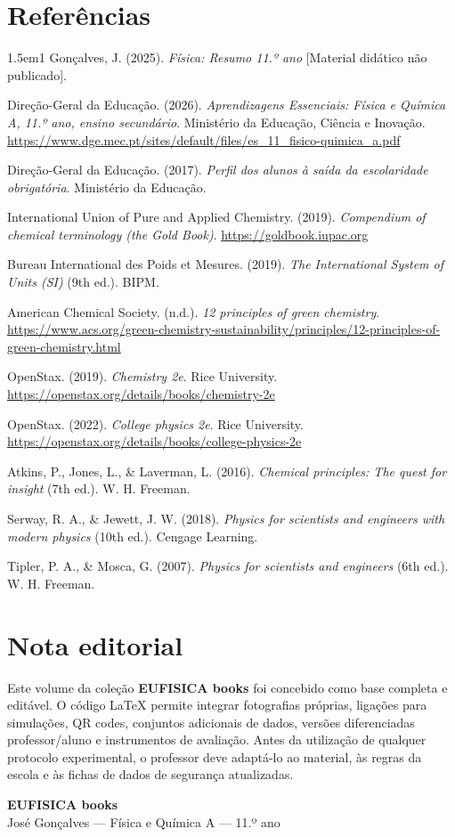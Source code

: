 \documentclass[11pt,a4paper,oneside]{book}
\begin{document}
\chapter{Referências}
\begin{hangparas}{1.5em}{1}
Gonçalves, J. (2025). \textit{Física: Resumo 11.º ano} [Material didático não publicado].

Direção-Geral da Educação. (2026). \textit{Aprendizagens Essenciais: Física e Química A, 11.º ano, ensino secundário}. Ministério da Educação, Ciência e Inovação. \url{https://www.dge.mec.pt/sites/default/files/es_11_fisico-quimica_a.pdf}

Direção-Geral da Educação. (2017). \textit{Perfil dos alunos à saída da escolaridade obrigatória}. Ministério da Educação.

International Union of Pure and Applied Chemistry. (2019). \textit{Compendium of chemical terminology (the Gold Book)}. \url{https://goldbook.iupac.org}

Bureau International des Poids et Mesures. (2019). \textit{The International System of Units (SI)} (9th ed.). BIPM.

American Chemical Society. (n.d.). \textit{12 principles of green chemistry}. \url{https://www.acs.org/green-chemistry-sustainability/principles/12-principles-of-green-chemistry.html}

OpenStax. (2019). \textit{Chemistry 2e}. Rice University. \url{https://openstax.org/details/books/chemistry-2e}

OpenStax. (2022). \textit{College physics 2e}. Rice University. \url{https://openstax.org/details/books/college-physics-2e}

Atkins, P., Jones, L., \& Laverman, L. (2016). \textit{Chemical principles: The quest for insight} (7th ed.). W. H. Freeman.

Serway, R. A., \& Jewett, J. W. (2018). \textit{Physics for scientists and engineers with modern physics} (10th ed.). Cengage Learning.

Tipler, P. A., \& Mosca, G. (2007). \textit{Physics for scientists and engineers} (6th ed.). W. H. Freeman.
\end{hangparas}

\chapter*{Nota editorial}
Este volume da coleção \textbf{EUFISICA books} foi concebido como base completa e editável. O código LaTeX permite integrar fotografias próprias, ligações para simulações, QR codes, conjuntos adicionais de dados, versões diferenciadas professor/aluno e instrumentos de avaliação. Antes da utilização de qualquer protocolo experimental, o professor deve adaptá-lo ao material, às regras da escola e às fichas de dados de segurança atualizadas.

\vfill
\begin{center}
\color{eublue}\Large\textbf{EUFISICA books}\\[4pt]
\normalsize José Gonçalves — Física e Química A — 11.º ano
\end{center}
\end{document}
